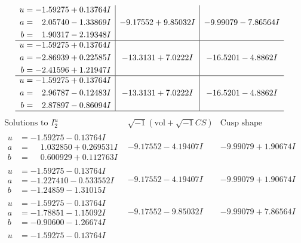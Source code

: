 \documentclass[1p]{elsarticle_modified}
\theoremstyle{definition}
\newcommand{\I}{\sqrt{-1}}
\begin{document}
$$\begin{array}{c|c|c}
\begin{aligned}
u &= -1.59275 + 0.13764 I \\
a &= \phantom{-}2.05740 - 1.33869 I \\
b &= \phantom{-}1.90317 - 2.19348 I\end{aligned}
 & -9.17552 + 9.85032 I & -9.99079 - 7.86564 I \\ \hline\begin{aligned}
u &= -1.59275 + 0.13764 I \\
a &= -2.86939 + 0.22585 I \\
b &= -2.41596 + 1.21947 I\end{aligned}
 & -13.3131 + 7.0222 I & -16.5201 - 4.8862 I \\ \hline\begin{aligned}
u &= -1.59275 + 0.13764 I \\
a &= \phantom{-}2.96787 - 0.12483 I \\
b &= \phantom{-}2.87897 - 0.86094 I\end{aligned}
 & -13.3131 + 7.0222 I & -16.5201 - 4.8862 I\\
 \hline 
 \end{array}$$\newpage$$\begin{array}{c|c|c}  
\text{Solutions to }I^u_{2}& \I (\text{vol} + \sqrt{-1}CS) & \text{Cusp shape}\\
 \hline 
\begin{aligned}
u &= -1.59275 - 0.13764 I \\
a &= \phantom{-}1.032850 + 0.269531 I \\
b &= \phantom{-}0.600929 + 0.112763 I\end{aligned}
 & -9.17552 - 4.19407 I & -9.99079 + 1.90674 I \\ \hline\begin{aligned}
u &= -1.59275 - 0.13764 I \\
a &= -1.227410 - 0.533552 I \\
b &= -1.24859 - 1.31015 I\end{aligned}
 & -9.17552 - 4.19407 I & -9.99079 + 1.90674 I \\ \hline\begin{aligned}
u &= -1.59275 - 0.13764 I \\
a &= -1.78851 - 1.15092 I \\
b &= -0.90600 - 1.26674 I\end{aligned}
 & -9.17552 - 9.85032 I & -9.99079 + 7.86564 I \\ \hline\begin{aligned}
u &= -1.59275 - 0.13764 I \\

\end{aligned}
\end{array}$$
\end{document}

